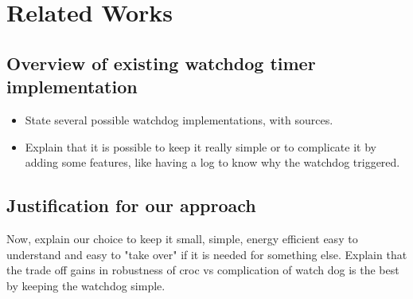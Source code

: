 
\chapter{Related Works}
\label{chap:related_work}

\section{Overview of existing watchdog timer implementation}
\begin{itemize}
  \item State several possible watchdog implementations, with sources.
  \item Explain that it is possible to keep it really simple or to complicate
    it by adding some features, like having a log to know why the watchdog triggered.
\end{itemize}

\section{Justification for our approach}
Now, explain our choice to keep it small, simple, energy efficient easy to understand
and easy to "take over" if it is needed for something else.
Explain that the trade off gains in robustness of croc vs complication of watch dog is
the best by keeping the watchdog simple.
